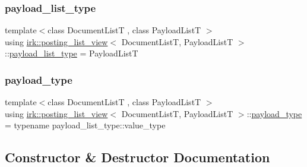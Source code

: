 \mbox{\label{classirk_1_1posting__list__view_aabf1afcb3a994971f30879354301e1fe}} 
\subsubsection{\texorpdfstring{payload\+\_\+list\+\_\+type}{payload\_list\_type}}
{\footnotesize\ttfamily template$<$class Document\+ListT , class Payload\+ListT $>$ \\
using \mbox{\hyperlink{classirk_1_1posting__list__view}{irk\+::posting\+\_\+list\+\_\+view}}$<$ Document\+ListT, Payload\+ListT $>$\+::\mbox{\hyperlink{classirk_1_1posting__list__view_aabf1afcb3a994971f30879354301e1fe}{payload\+\_\+list\+\_\+type}} =  Payload\+ListT}

\mbox{\label{classirk_1_1posting__list__view_a1c394061061a8eeeab98cb228f6cdde9}} 
\subsubsection{\texorpdfstring{payload\+\_\+type}{payload\_type}}
{\footnotesize\ttfamily template$<$class Document\+ListT , class Payload\+ListT $>$ \\
using \mbox{\hyperlink{classirk_1_1posting__list__view}{irk\+::posting\+\_\+list\+\_\+view}}$<$ Document\+ListT, Payload\+ListT $>$\+::\mbox{\hyperlink{classirk_1_1posting__list__view_a1c394061061a8eeeab98cb228f6cdde9}{payload\+\_\+type}} =  typename payload\+\_\+list\+\_\+type\+::value\+\_\+type}



\subsection{Constructor \& Destructor Documentation}
\mbox{\label{classirk_1_1posting__list__view_a2a67139a8790a38cffe1f20323c96bd2}} 

